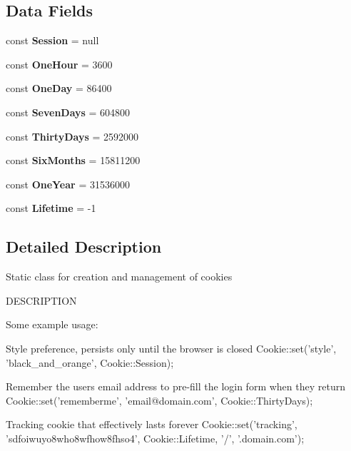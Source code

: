 \subsection*{Data Fields}
\begin{DoxyCompactItemize}
\item 
\hypertarget{class_cookie_a3880a2d65111dd04ed2762c3516238c4}{const {\bfseries Session} = null}\label{class_cookie_a3880a2d65111dd04ed2762c3516238c4}

\item 
\hypertarget{class_cookie_ab0d5d43ef5de3a8b8d246f38d4011644}{const {\bfseries One\-Hour} = 3600}\label{class_cookie_ab0d5d43ef5de3a8b8d246f38d4011644}

\item 
\hypertarget{class_cookie_aa521862df1faf3bae91e826bdd7c4307}{const {\bfseries One\-Day} = 86400}\label{class_cookie_aa521862df1faf3bae91e826bdd7c4307}

\item 
\hypertarget{class_cookie_a272654e12377439eb99efbc6cb9493b0}{const {\bfseries Seven\-Days} = 604800}\label{class_cookie_a272654e12377439eb99efbc6cb9493b0}

\item 
\hypertarget{class_cookie_ae5e80f88a08010c095ce85a659f5c819}{const {\bfseries Thirty\-Days} = 2592000}\label{class_cookie_ae5e80f88a08010c095ce85a659f5c819}

\item 
\hypertarget{class_cookie_a89aba8b2219057356a151cca43412b1d}{const {\bfseries Six\-Months} = 15811200}\label{class_cookie_a89aba8b2219057356a151cca43412b1d}

\item 
\hypertarget{class_cookie_ae1a7aa52bbb1caabe1babbfb6b74921c}{const {\bfseries One\-Year} = 31536000}\label{class_cookie_ae1a7aa52bbb1caabe1babbfb6b74921c}

\item 
\hypertarget{class_cookie_ae4b90b216439b5f4fd00c88bd87a26e1}{const {\bfseries Lifetime} = -\/1}\label{class_cookie_ae4b90b216439b5f4fd00c88bd87a26e1}

\end{DoxyCompactItemize}


\subsection{Detailed Description}
Static class for creation and management of cookies

D\-E\-S\-C\-R\-I\-P\-T\-I\-O\-N \begin{DoxyVerb}Some example usage:

 Style preference, persists only until the browser is closed
 Cookie::set('style', 'black_and_orange', Cookie::Session);

 Remember the users email address to pre-fill the login form when they return
 Cookie::set('rememberme', 'email@domain.com', Cookie::ThirtyDays);

 Tracking cookie that effectively lasts forever
 Cookie::set('tracking', 'sdfoiwuyo8who8wfhow8fhso4', Cookie::Lifetime, '/', '.domain.com');\end{DoxyVerb}
 

